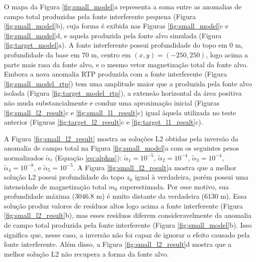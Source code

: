 O mapa da Figura \ref{fig:small_model}a representa a soma entre as anomalias de campo total produzidas pela fonte interferente pequena (Figura \ref{fig:small_model}b), cuja forma é exibida nas Figuras \ref{fig:small_model}c e \ref{fig:small_model}d, e aquela produzida pela fonte alvo simulada (Figura \ref{fig:target_model}a). 
A fonte interferente possui profundidade do topo em $0$ m, profundidade da base em $70$ m, 
centro em $(x, y) = (-250, 250)$, logo acima a parte mais rasa da fonte alvo, e o mesmo vetor magnetização total da fonte alvo.
Embora a nova anomalia RTP produzida com a fonte interferente (Figura 
\ref{fig:small_model_rtp}) tem uma amplitude maior que a produzida pela fonte alvo isolada (Figura \ref{fig:target_model_rtp}), a extensão horizontal da área positiva não muda substancialmente e conduz uma aproximação inicial
(Figuras \ref{fig:small_l2_result}c e \ref{fig:small_l1_result}c) igual àquela utilizada no teste anterior (Figuras \ref{fig:target_l2_result}c e 
\ref{fig:target_l1_result}c).

A Figura \ref{fig:small_l2_result} mostra as soluções L2 obtidas pela inversão da anomalia de campo total na Figura \ref{fig:small_model}a
com os seguintes pesos normalizados $\tilde{\alpha}_{\ell}$ (Equação \ref{eq:alphas}):
$\tilde{\alpha}_{1} = 10^{-5}$, $\tilde{\alpha}_{2} = 10^{-4}$, 
$\tilde{\alpha}_{3} = 10^{-4}$, $\tilde{\alpha}_{4} = 10^{-8}$, e 
$\tilde{\alpha}_{5} = 10^{-5}$.
A Figura \ref{fig:small_l2_result}a mostra que a melhor solução L2 possui profundidade do topo $z_{0}$ igual à verdadeira, porém possui uma intensidade de magnetização total $m_{0}$ superestimada. Por esse motivo, sua profundidade máxima 
($3046.8$ m) é muito distante da verdadeira ($6130$ m).
Essa solução produz valores de resíduos altos logo acima a fonte interferente  
(Figura \ref{fig:small_l2_result}b), mas esses resíduos diferem consideravelmente da anomalia de campo total produzida pela fonte interferente (Figura \ref{fig:small_model}b).
Isso significa que, nesse caso, a inversão não foi capaz de ignorar o efeito causado pela fonte interferente.
Além disso, a Figura \ref{fig:small_l2_result}d mostra que a melhor solução L2 não recupera a forma da fonte alvo.

